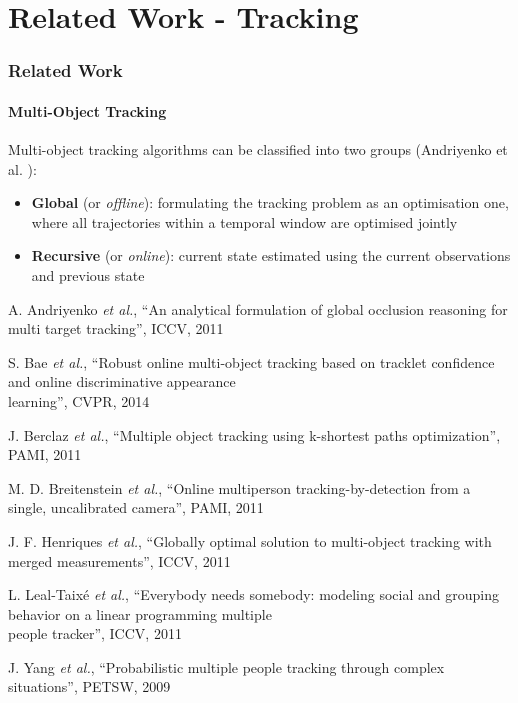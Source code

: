 \section{Related Work - Tracking}

\begin{frame}
	\frametitle{Related Work}
	\framesubtitle{Multi-Object Tracking}
	
	\Large
	
	\vspace{0.15cm}
	
	Multi-object tracking algorithms can be classified into two groups (Andriyenko et al.
	\cite{Andriyenko11}):
	
	\begin{itemize}
		\item \textbf{Global} (or \emph{offline}): formulating the tracking problem as an optimisation
			  one, where all trajectories within a temporal window are optimised jointly
			  \cite{Berclaz11,Henriques11,Leal11}
		\item \textbf{Recursive} (or \emph{online}): current state estimated using the current
			  observations and previous state \cite{Bae14,Breitenstein11,Yang09}
	\end{itemize}
	
	\vspace{0.1cm}
	
	\tiny
	
	\cite{Andriyenko11} A. Andriyenko \emph{et al.}, ``An analytical formulation of global occlusion
	reasoning for multi target tracking'', ICCV, 2011
	
	\cite{Bae14} S. Bae \emph{et al.}, ``Robust online multi-object tracking based on tracklet
	confidence and online discriminative appearance\\ \hspace{0.25cm} learning'', CVPR, 2014
	
	\cite{Berclaz11} J. Berclaz \emph{et al.}, ``Multiple object tracking using k-shortest paths
	optimization'', PAMI, 2011
	
	\cite{Breitenstein11} M. D. Breitenstein \emph{et al.}, ``Online multiperson tracking-by-detection
	from a single, uncalibrated camera'', PAMI, 2011
	
	\cite{Henriques11} J. F. Henriques \emph{et al.}, ``Globally optimal solution to multi-object
	tracking with merged measurements'', ICCV, 2011
	
	\cite{Leal11} L. Leal-Taix{\'e} \emph{et al.}, ``Everybody needs somebody: modeling social and
	grouping behavior on a linear programming multiple\\ \hspace{0.25cm} people tracker'', ICCV, 2011
	
	\cite{Yang09} J. Yang \emph{et al.}, ``Probabilistic multiple people tracking through complex
	situations'', PETSW, 2009
	
\end{frame}

